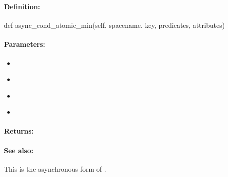 \pagebreak
\subsubsection{}
\label{api:python:async_cond_atomic_min}


\paragraph{Definition:}
\begin{pythoncode}
def async_cond_atomic_min(self, spacename, key, predicates, attributes)
\end{pythoncode}

\paragraph{Parameters:}
\begin{itemize}[noitemsep]
\item {}\\

\item {}\\

\item {}\\

\item {}\\

\end{itemize}

\paragraph{Returns:}


\paragraph{See also:}  This is the asynchronous form of .

\pagebreak
\subsubsection{}
\label{api:python:atomic_max}


